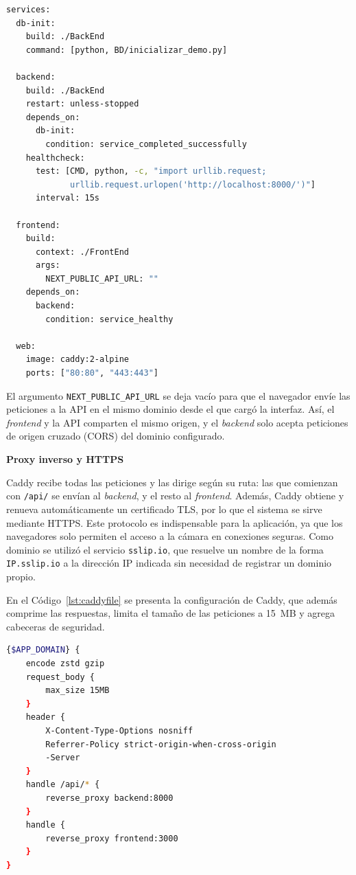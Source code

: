 \begin{lstlisting}[language=bash, caption={Extracto de compose.demo.yml: orden de arranque de los servicios}, label={lst:compose_demo}]
services:
  db-init:
    build: ./BackEnd
    command: [python, BD/inicializar_demo.py]

  backend:
    build: ./BackEnd
    restart: unless-stopped
    depends_on:
      db-init:
        condition: service_completed_successfully
    healthcheck:
      test: [CMD, python, -c, "import urllib.request;
             urllib.request.urlopen('http://localhost:8000/')"]
      interval: 15s

  frontend:
    build:
      context: ./FrontEnd
      args:
        NEXT_PUBLIC_API_URL: ""
    depends_on:
      backend:
        condition: service_healthy

  web:
    image: caddy:2-alpine
    ports: ["80:80", "443:443"]
\end{lstlisting}

El argumento \texttt{NEXT\_PUBLIC\_API\_URL} se deja vacío para que el navegador envíe las peticiones a la API en el mismo dominio desde el que cargó la interfaz. Así, el \textit{frontend} y la API comparten el mismo origen, y el \textit{backend} solo acepta peticiones de origen cruzado (CORS) del dominio configurado.

\textbf{Proxy inverso y HTTPS}

Caddy recibe todas las peticiones y las dirige según su ruta: las que comienzan con \texttt{/api/} se envían al \textit{backend}, y el resto al \textit{frontend}. Además, Caddy obtiene y renueva automáticamente un certificado TLS, por lo que el sistema se sirve mediante HTTPS. Este protocolo es indispensable para la aplicación, ya que los navegadores solo permiten el acceso a la cámara en conexiones seguras. Como dominio se utilizó el servicio \texttt{sslip.io}, que resuelve un nombre de la forma \texttt{IP.sslip.io} a la dirección IP indicada sin necesidad de registrar un dominio propio.

En el Código~\ref{lst:caddyfile} se presenta la configuración de Caddy, que además comprime las respuestas, limita el tamaño de las peticiones a 15~MB y agrega cabeceras de seguridad.

\begin{lstlisting}[language=bash, caption={Configuración del proxy inverso (Caddyfile)}, label={lst:caddyfile}]
{$APP_DOMAIN} {
    encode zstd gzip
    request_body {
        max_size 15MB
    }
    header {
        X-Content-Type-Options nosniff
        Referrer-Policy strict-origin-when-cross-origin
        -Server
    }
    handle /api/* {
        reverse_proxy backend:8000
    }
    handle {
        reverse_proxy frontend:3000
    }
}
\end{lstlisting}

